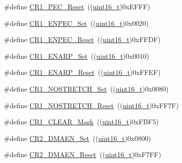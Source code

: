 \begin{DoxyCompactItemize}
\item 
\#define \hyperlink{group___i2_c___private___defines_gabb6969dfa44c3539ef93f04f8136c3c7}{C\+R1\+\_\+\+P\+E\+C\+\_\+\+Reset}~((\hyperlink{_p_e___types_8h_a1f1825b69244eb3ad2c7165ddc99c956}{uint16\+\_\+t})0x\+E\+F\+F\+F)
\item 
\#define \hyperlink{group___i2_c___private___defines_ga7fdf69341e5debc3244812012ae332e6}{C\+R1\+\_\+\+E\+N\+P\+E\+C\+\_\+\+Set}~((\hyperlink{_p_e___types_8h_a1f1825b69244eb3ad2c7165ddc99c956}{uint16\+\_\+t})0x0020)
\item 
\#define \hyperlink{group___i2_c___private___defines_gabd33104d7b8e4673fa330f4ca3a97e44}{C\+R1\+\_\+\+E\+N\+P\+E\+C\+\_\+\+Reset}~((\hyperlink{_p_e___types_8h_a1f1825b69244eb3ad2c7165ddc99c956}{uint16\+\_\+t})0x\+F\+F\+D\+F)
\item 
\#define \hyperlink{group___i2_c___private___defines_ga73cfd7b486b4279fc6a83de64ab23985}{C\+R1\+\_\+\+E\+N\+A\+R\+P\+\_\+\+Set}~((\hyperlink{_p_e___types_8h_a1f1825b69244eb3ad2c7165ddc99c956}{uint16\+\_\+t})0x0010)
\item 
\#define \hyperlink{group___i2_c___private___defines_ga173b065ec9b7b33c0fa0bf71c0fa2207}{C\+R1\+\_\+\+E\+N\+A\+R\+P\+\_\+\+Reset}~((\hyperlink{_p_e___types_8h_a1f1825b69244eb3ad2c7165ddc99c956}{uint16\+\_\+t})0x\+F\+F\+E\+F)
\item 
\#define \hyperlink{group___i2_c___private___defines_gac4abee43c3523527780f200adf465bc0}{C\+R1\+\_\+\+N\+O\+S\+T\+R\+E\+T\+C\+H\+\_\+\+Set}~((\hyperlink{_p_e___types_8h_a1f1825b69244eb3ad2c7165ddc99c956}{uint16\+\_\+t})0x0080)
\item 
\#define \hyperlink{group___i2_c___private___defines_ga9a1609fd4bbcc38fc6423836730c8fa0}{C\+R1\+\_\+\+N\+O\+S\+T\+R\+E\+T\+C\+H\+\_\+\+Reset}~((\hyperlink{_p_e___types_8h_a1f1825b69244eb3ad2c7165ddc99c956}{uint16\+\_\+t})0x\+F\+F7\+F)
\item 
\#define \hyperlink{group___i2_c___private___defines_ga67f7dd35ea3d1296677e5fc50b88fa90}{C\+R1\+\_\+\+C\+L\+E\+A\+R\+\_\+\+Mask}~((\hyperlink{_p_e___types_8h_a1f1825b69244eb3ad2c7165ddc99c956}{uint16\+\_\+t})0x\+F\+B\+F5)
\item 
\#define \hyperlink{group___i2_c___private___defines_gafe82da50fa03bd5ecb36340da64c87ca}{C\+R2\+\_\+\+D\+M\+A\+E\+N\+\_\+\+Set}~((\hyperlink{_p_e___types_8h_a1f1825b69244eb3ad2c7165ddc99c956}{uint16\+\_\+t})0x0800)
\item 
\#define \hyperlink{group___i2_c___private___defines_gabe742f89a768e29b9a2d86f7782991a6}{C\+R2\+\_\+\+D\+M\+A\+E\+N\+\_\+\+Reset}~((\hyperlink{_p_e___types_8h_a1f1825b69244eb3ad2c7165ddc99c956}{uint16\+\_\+t})0x\+F7\+F\+F)

\end{DoxyCompactItemize}
